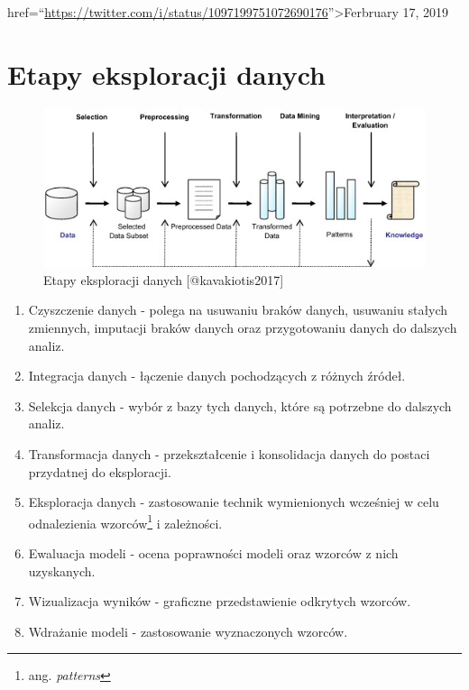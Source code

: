 \documentclass[
]{book}
\providecommand{\tightlist}{%
  \setlength{\itemsep}{0pt}\setlength{\parskip}{0pt}}
\theoremstyle{plain}
\theoremstyle{definition}
\theoremstyle{definition}
\theoremstyle{definition}
\theoremstyle{definition}
\theoremstyle{remark}
\begin{document}
href=``\url{https://twitter.com/i/status/1097199751072690176}''\textgreater Ferbruary 17, 2019

\hypertarget{etapy-eksploracji-danych}{%
\section*{Etapy eksploracji danych}\label{etapy-eksploracji-danych}}

\begin{figure}
\includegraphics[width=7.35in]{images/dm_stages} \caption{Etapy eksploracji danych [@kavakiotis2017]}\label{fig:unnamed-chunk-2}
\end{figure}

\begin{enumerate}
\def\labelenumi{\arabic{enumi}.}
\tightlist
\item
  Czyszczenie danych - polega na usuwaniu braków danych, usuwaniu stałych zmiennych, imputacji braków danych oraz przygotowaniu danych do dalszych analiz.
\item
  Integracja danych - łączenie danych pochodzących z różnych źródeł.
\item
  Selekcja danych - wybór z bazy tych danych, które są potrzebne do dalszych analiz.
\item
  Transformacja danych - przekształcenie i konsolidacja danych do postaci przydatnej do eksploracji.
\item
  Eksploracja danych - zastosowanie technik wymienionych wcześniej w celu odnalezienia wzorców\footnote{ang. \emph{patterns}} i zależności.
\item
  Ewaluacja modeli - ocena poprawności modeli oraz wzorców z nich uzyskanych.
\item
  Wizualizacja wyników - graficzne przedstawienie odkrytych wzorców.
\item
  Wdrażanie modeli - zastosowanie wyznaczonych wzorców.
\end{enumerate}
\end{document}
